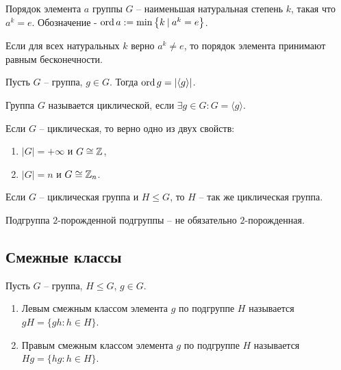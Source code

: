 \begin{definition}
    Порядок элемента $a$ группы $G$ -- наименьшая натуральная степень $k$, такая что $a^k = e$. 
    Обозначение - $\operatorname{ord} a := \min \left\{k \: | \: a^k = e\right\}$.
\end{definition}

\begin{note}
    Если для всех натуральных $k$ верно $a^k \neq e$, то порядок элемента принимают равным бесконечности.
\end{note}

\begin{proposition}
    Пусть $G$ -- группа, $g \in G$. Тогда $\operatorname{ord} g = | \langle g \rangle |$.
\end{proposition}

\begin{definition}
    Группа $G$ называется циклической, если $\exists g \in G: G = \langle g \rangle$.
\end{definition}

\begin{proposition}
    Если $G$ -- циклическая, то верно одно из двух свойств:
    \begin{enumerate}
        \item $|G| = + \infty$ и $G \cong \mathbb{Z}$,
        \item $|G| = n$ и $G \cong \mathbb{Z}_n$.
    \end{enumerate}
\end{proposition}

\begin{theorem}
    Если $G$ -- циклическая группа и $H \leq G$, то $H$ -- так же циклическая группа.
\end{theorem}

\begin{note}
    Подгруппа $2$-порожденной подгруппы -- не обязательно $2$-порожденная.
\end{note}

\subsection{Смежные классы}

\begin{definition}
    Пусть $G$ -- группа, $H \leq G$, $g \in G$. \begin{enumerate}
        \item Левым смежным классом элемента $g$ по подгруппе $H$ называется $gH = \{gh: h \in H\}$.
        \item Правым смежным классом элемента $g$ по подгруппе $H$ называется $Hg = \{hg: h \in H\}$.
    \end{enumerate} 
\end{definition}

